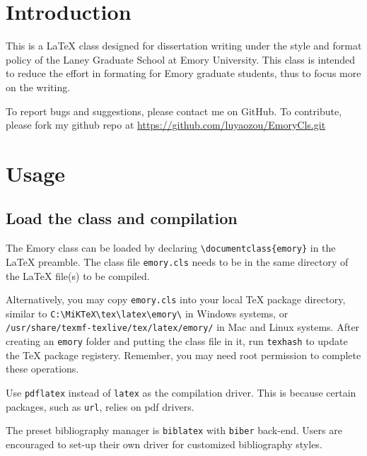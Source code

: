 \documentclass[final]{emory}
\begin{document}
\maketoc

\chapter{Introduction}

This is a \LaTeX{} class designed for dissertation writing under the style and
format policy of the Laney Graduate School at Emory University.\autocite{emory-style}
This class is
intended to reduce the effort in formating for Emory graduate students, thus 
to focus more on the writing. 

To report bugs and suggestions, please contact me on GitHub. To contribute, 
please fork my github repo at \url{https://github.com/luyaozou/EmoryCls.git}

\chapter{Usage}
\section{Load the class and compilation}
The Emory class can be loaded by declaring
\Verb|\documentclass{emory}| in the \LaTeX{} preamble. The class file
\Verb|emory.cls| needs to be in the same directory of the \LaTeX{} file(s) to be 
compiled. 

Alternatively, you may copy \Verb|emory.cls| into your local \TeX{} package 
directory, similar to \Verb|C:\MiKTeX\tex\latex\emory\| in Windows systems, or\\
\Verb|/usr/share/texmf-texlive/tex/latex/emory/| in Mac and Linux systems. After
creating an \Verb|emory| folder and putting the class file in it, run
\Verb|texhash| to update the \TeX{} package registery. Remember, you may need
root permission to complete these operations. 

Use \Verb|pdflatex| instead of \Verb|latex| as the compilation driver. This
is because certain packages, such as \Verb|url|, relies on pdf drivers.

The preset bibliography manager is \Verb|biblatex| with \Verb|biber| back-end. 
Users are encouraged to set-up their own \BibTeX{} driver for customized bibliography styles.
\end{document}
